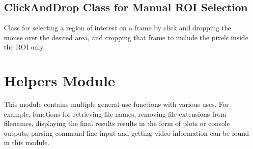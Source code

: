 
\subsection{ClickAndDrop Class for Manual ROI Selection}
\label{sec:code-ClickAndDrop}

Class for selecting a region of interest on a frame by click and dropping the mouse over the desired area, and cropping that frame to include the pixels inside the ROI only.




\clearpage
\section{Helpers Module}
\label{sec:code-helpers-module}

This module contains multiple general-use functions with various uses. For example, functions for retrieving file names, removing file extensions from filenames, displaying the final results results in the form of plots or console outputs, parsing command line input and getting video information can be found in this module.

